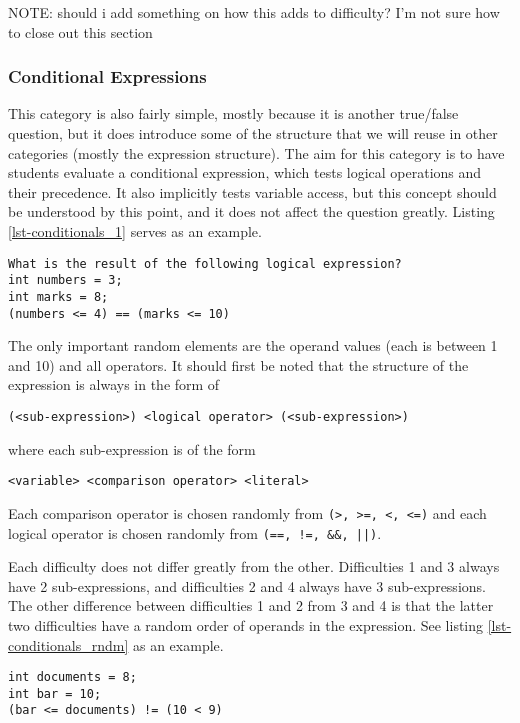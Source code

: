 \documentclass{article}
\begin{document}
NOTE: should i add something on how this adds to difficulty? I'm not sure how to close out this section

\subsubsection{Conditional Expressions} \label{subsubsec-condtional_expressions}
This category is also fairly simple, mostly because it is another true/false question, but it does introduce some of the structure that we will reuse in other
categories (mostly the expression structure). The aim for this category is to have students evaluate a conditional expression, which tests logical operations
and their precedence. It also implicitly tests variable access, but this concept should be understood by this point, and it does not affect the question greatly.
Listing \ref{lst-conditionals_1} serves as an example.

\begin{lstlisting}[breaklines=true, caption={Conditional Expressions Question}, label=lst-conditionals_1]
What is the result of the following logical expression? 
int numbers = 3; 
int marks = 8; 
(numbers <= 4) == (marks <= 10) 
\end{lstlisting}


The only important random elements are the operand values (each is between 1 and 10) and all operators. It should first be noted that the structure of the expression
is always in the form of 
\begin{Verbatim}
(<sub-expression>) <logical operator> (<sub-expression>)
\end{Verbatim}
where each sub-expression is of the form 
\begin{Verbatim}
<variable> <comparison operator> <literal>
\end{Verbatim}
Each comparison operator is chosen randomly from \verb;(>, >=, <, <=); and each logical operator is chosen randomly from \verb;(==, !=, &&, ||);. 

Each difficulty does not differ greatly from the other. Difficulties 1 and 3 always have 2 sub-expressions, and difficulties 2 and 4 always have 3 sub-expressions. The other
difference between difficulties 1 and 2 from 3 and 4 is that the latter two difficulties have a random order of operands in the expression. See listing \ref{lst-conditionals_rndm} as an example.

\begin{lstlisting}[caption={Conditional Question with Random Order of Operands}, label=lst-conditionals_rndm]
int documents = 8;
int bar = 10;
(bar <= documents) != (10 < 9)
\end{lstlisting}
\end{document}
